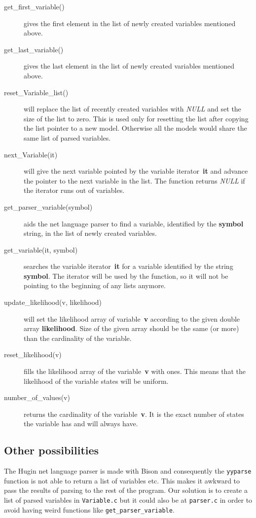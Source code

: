 \documentclass[12pt,a4paper]{report}
\newcommand{\cdatatype}[1]{{\it #1}}
\newcommand{\cfilename}[1]{\texttt{#1}}
\newcommand{\cparameter}[1]{\textbf{#1}}
\newcommand{\cfunction}[1]{\texttt{#1}}
\begin{document}
\begin{description}
\item[get\_first\_variable()] gives the first element in the list
of newly created variables mentioned above.

\item[get\_last\_variable()] gives the last element in the list
of newly created variables mentioned above.

\item[reset\_Variable\_list()] will replace the list of recently
created variables with \cdatatype{NULL} and set the size of the list
to zero. This is used only for resetting the list after copying the
list pointer to a new model. Otherwise all the models would share the
same list of parsed variables.

\item[next\_Variable(it)] will give the next variable pointed by the
variable iterator~\cparameter{it} and advance the pointer to the next
variable in the list. The function returns \cdatatype{NULL} if the
iterator runs out of variables.

\item[get\_parser\_variable(symbol)] aids the net language parser 
to find a variable, identified by the \cparameter{symbol} string, in the 
list of newly created variables.

\item[get\_variable(it, symbol)] searches the variable
iterator~\cparameter{it} for a variable identified by the string
\cparameter{symbol}. The iterator will be used by the function, so it
will not be pointing to the beginning of any lists anymore.

\item[update\_likelihood(v, likelihood)] will set the likelihood array
of variable~\cparameter{v} according to the given double array
\cparameter{likelihood}. Size of the given array should be the same
(or more) than the cardinality of the variable.

\item[reset\_likelihood(v)] fills the likelihood array of the
variable~\cparameter{v} with ones. This means that the likelihood of the
variable states will be uniform.

\item[number\_of\_values(v)] returns the cardinality of the
variable~\cparameter{v}. It is the exact number of states the variable
has and will always have.
\end{description}


\subsection{Other possibilities}
The Hugin net language parser is made with Bison and consequently the 
\cfunction{yyparse} function is not able to return a list of
variables etc. This makes it awkward to pass the results of parsing to
the rest of the program. Our solution is to create a list of parsed
variables in \cfilename{Variable.c} but it could also be at
\cfilename{parser.c} in order to avoid having weird functions like
\cfunction{get\_parser\_variable}.
\end{document}
